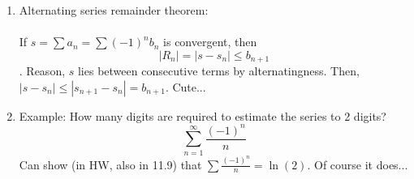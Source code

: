 \documentclass{article}
\newcommand{\ds}{\displaystyle}
\begin{document}
\begin{enumerate}
\item Alternating series remainder theorem: \\ \ \\
If $s=\sum a_n = \sum (-1)^n b_n$ is convergent, then
$$
|R_n| = |s-s_n| \leq b_{n+1}
$$.
Reason, $s$ lies between consecutive terms by alternatingness. Then, 
$|s-s_n| \leq |s_{n+1}-s_n| = b_{n+1}$. Cute...

\item Example: How many digits are required to estimate the series to 2 digits? 
$$
\sum_{n=1}^{\infty} \frac{(-1)^n}{n}
$$
Can show (in HW, also in 11.9) that $\ds \sum \frac{(-1)^n}{n}=\ln(2)$. Of course it does...
\end{enumerate}


\end{document}
